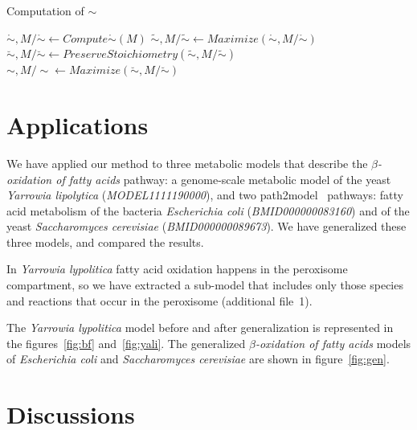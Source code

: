 \documentclass[10pt]{bmc_article}
\newenvironment{bmcformat}{\baselineskip20pt\sloppy\setboolean{publ}{false}}{\baselineskip20pt\sloppy}
\begin{document}
\begin{bmcformat}
\begin{algorithm}[H]
\SetAlgoVlined
{}
\caption{Computation of ${\sim}$}
\BlankLine
\BlankLine
$\mathring{\sim}, M/\mathring{\sim} \leftarrow Compute\mathring{\sim}(M)$ \;
$\tilde{\sim}, M/\tilde{\sim} \leftarrow Maximize(\mathring{\sim}, M/{\mathring{\sim}})$ \;
$\breve{\sim}, M/\breve{\sim} \leftarrow PreserveStoichiometry(\tilde{\sim}, M/\tilde{\sim})$ \;
$\sim, M/\sim \leftarrow Maximize(\breve{\sim}, M/\breve{\sim})$ \;
\BlankLine
{}
\end{algorithm} 

\section*{Applications}
We have applied our method to three metabolic models that describe the \textit{$\beta$-oxidation of fatty acids} pathway: a genome-scale metabolic model of the yeast \textit{Yarrowia lipolytica} (\emph{MODEL1111190000}), and two path2model~\cite{Li10} pathways: fatty acid metabolism of the bacteria \textit{Escherichia coli} (\emph{BMID000000083160}) and of the yeast \textit{Saccharomyces cerevisiae} (\emph{BMID000000089673}). We have generalized these three models, and compared the results. 

In \textit{Yarrowia lypolitica} fatty acid oxidation happens in the peroxisome compartment, so we have extracted a sub-model that includes only those species and reactions that occur in the peroxisome (additional file~1). 

The \textit{Yarrowia lypolitica} model before and after generalization is represented in the figures~\ref{fig:bf} and~\ref{fig:yali}.
The generalized \textit{$\beta$-oxidation of fatty acids} models of \textit{Escherichia coli} and \textit{Saccharomyces cerevisiae} are shown in figure~\ref{fig:gen}.

\section*{Discussions}


\end{bmcformat}
\end{document}
